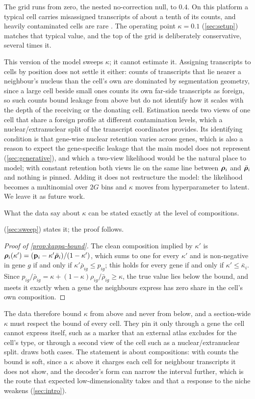 The grid runs from zero, the nested no-correction null, to $0.4$. On this platform a typical cell carries misassigned transcripts of about a tenth of its counts, and heavily contaminated cells are rare \citep{yang2025mistic}. The operating point $\kappa = 0.1$ (\cref{sec:setup}) matches that typical value, and the top of the grid is deliberately conservative, several times it.

This version of the model sweeps $\kappa$; it cannot estimate it. Assigning transcripts to cells by position does not settle it either: counts of transcripts that lie nearer a neighbour's nucleus than the cell's own are dominated by segmentation geometry, since a large cell beside small ones counts its own far-side transcripts as foreign, so such counts bound leakage from above but do not identify how it scales with the depth of the receiving or the donating cell. Estimation needs two views of one cell that share a foreign profile at different contamination levels, which a nuclear/extranuclear split of the transcript coordinates provides. Its identifying condition is that gene-wise nuclear retention varies across genes, which is also a reason to expect the gene-specific leakage that the main model does not represent (\cref{sec:generative}), and which a two-view likelihood would be the natural place to model; with constant retention both views lie on the same line between $\boldsymbol{\rho}_i$ and $\bar{\boldsymbol{\rho}}_i$ and nothing is pinned. Adding it does not restructure the model: the likelihood becomes a multinomial over $2G$ bins and $\kappa$ moves from hyperparameter to latent. We leave it as future work.

What the data say about $\kappa$ can be stated exactly at the level of compositions.

 (\cref{sec:sweep}) states it; the proof follows.
\begin{proof}[Proof of \cref{prop:kappa-bound}]
The clean composition implied by $\kappa'$ is $\boldsymbol{\rho}_i(\kappa') = (\mathbf{p}_i - \kappa'\bar{\boldsymbol{\rho}}_i)/(1-\kappa')$, which sums to one for every $\kappa'$ and is non-negative in gene $g$ if and only if $\kappa'\bar\rho_{ig} \le p_{ig}$; this holds for every gene if and only if $\kappa' \le \bar\kappa_i$. Since $p_{ig}/\bar\rho_{ig} = \kappa + (1-\kappa)\rho_{ig}/\bar\rho_{ig} \ge \kappa$, the true value lies below the bound, and meets it exactly when a gene the neighbours express has zero share in the cell's own composition.
\end{proof}

The data therefore bound $\kappa$ from above and never from below, and a section-wide $\kappa$ must respect the bound of every cell. They pin it only through a gene the cell cannot express itself, such as a marker that an external atlas excludes for the cell's type, or through a second view of the cell such as a nuclear/extranuclear split.  draws both cases. The statement is about compositions: with counts the bound is soft, since a $\kappa$ above it charges each cell for neighbour transcripts it does not show, and the decoder's form can narrow the interval further, which is the route that expected low-dimensionality takes and that a response to the niche weakens (\cref{sec:intro}).

